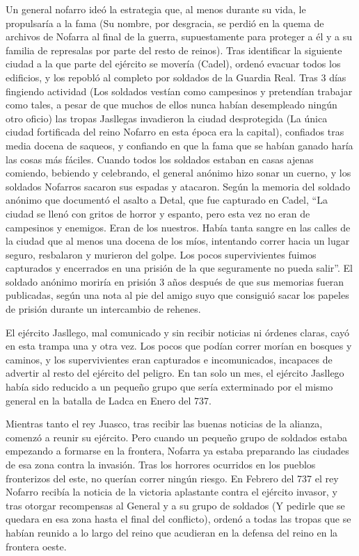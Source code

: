 Un general nofarro ideó la estrategia que, al menos durante su vida, le propulsaría a la fama (Su nombre, por desgracia, se perdió en la quema de archivos de Nofarra al final de la guerra, supuestamente para proteger a él y a su familia de represalas por parte del resto de reinos). Tras identificar la siguiente ciudad a la que parte del ejército se movería (Cadel), ordenó evacuar todos los edificios, y los repobló al completo por soldados de la Guardia Real. Tras 3 días fingiendo actividad (Los soldados vestían como campesinos y pretendían trabajar como tales, a pesar de que muchos de ellos nunca habían desempleado ningún otro oficio) las tropas Jasllegas invadieron la ciudad desprotegida (La única ciudad fortificada del reino Nofarro en esta época era la capital), confiados tras media docena de saqueos, y confiando en que la fama que se habían ganado haría las cosas más fáciles. Cuando todos los soldados estaban en casas ajenas comiendo, bebiendo y celebrando, el general anónimo hizo sonar un cuerno, y los soldados Nofarros sacaron sus espadas y atacaron. Según la memoria del soldado anónimo que documentó el asalto a Detal, que fue capturado en Cadel, ``La ciudad se llenó con gritos de horror y espanto, pero esta vez no eran de campesinos y enemigos. Eran de los nuestros. Había tanta sangre en las calles de la ciudad que al menos una docena de los míos, intentando correr hacia un lugar seguro, resbalaron y murieron del golpe. Los pocos supervivientes fuimos capturados y encerrados en una prisión de la que seguramente no pueda salir''. El soldado anónimo moriría en prisión 3 años después de que sus memorias fueran publicadas, según una nota al pie del amigo suyo que consiguió sacar los papeles de prisión durante un intercambio de rehenes.
\par 
El ejército Jasllego, mal comunicado y sin recibir noticias ni órdenes claras, cayó en esta trampa una y otra vez. Los pocos que podían correr morían en bosques y caminos, y los supervivientes eran capturados e incomunicados, incapaces de advertir al resto del ejército del peligro. En tan solo un mes, el ejército Jasllego había sido reducido a un pequeño grupo que sería exterminado por el mismo general en la batalla de Ladca en Enero del 737. 
\par 
Mientras tanto el rey Juasco, tras recibir las buenas noticias de la alianza, comenzó a reunir su ejército. Pero cuando un pequeño grupo de soldados estaba empezando a formarse en la frontera, Nofarra ya estaba preparando las ciudades de esa zona contra la invasión. Tras los horrores ocurridos en los pueblos fronterizos del este, no querían correr ningún riesgo. En Febrero del 737 el rey Nofarro recibía la noticia de la victoria aplastante contra el ejército invasor, y tras otorgar recompensas al General y a su grupo de soldados (Y pedirle que se quedara en esa zona hasta el final del conflicto), ordenó a todas las tropas que se habían reunido a lo largo del reino que acudieran en la defensa del reino en la frontera oeste. 
